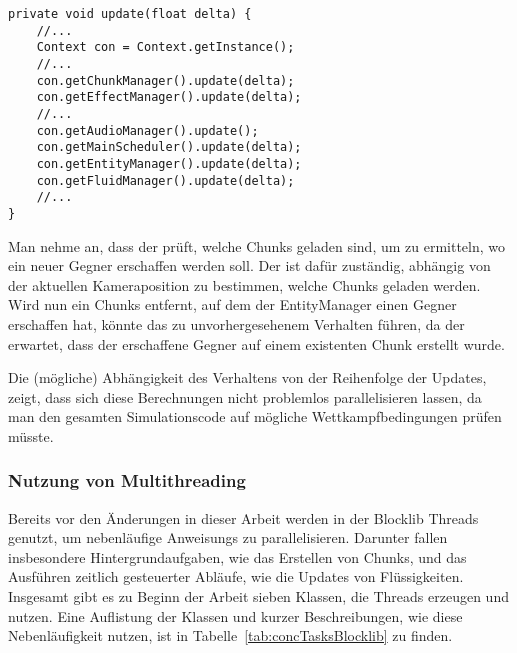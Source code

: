 \begin{lstlisting}[caption={Vereinfachte Update-Methode von \classGame{}.}, label={lst:gameUpdate},float={htbp}]
private void update(float delta) {
	//...
	Context con = Context.getInstance();
	//...
	con.getChunkManager().update(delta);
	con.getEffectManager().update(delta);
	//...
	con.getAudioManager().update();
	con.getMainScheduler().update(delta);
	con.getEntityManager().update(delta);
	con.getFluidManager().update(delta);
	//...
}
\end{lstlisting}

\begin{example}
Man nehme an, dass der \classEntityManager{} prüft, welche Chunks geladen sind, um zu ermitteln, wo ein neuer Gegner erschaffen werden soll. Der \classChunkManager{} ist dafür zuständig, abhängig von der aktuellen Kameraposition zu bestimmen, welche Chunks geladen werden. Wird nun ein Chunks entfernt, auf dem der EntityManager einen Gegner erschaffen hat, könnte das zu unvorhergesehenem Verhalten führen, da der \classEntityManager{} erwartet, dass der erschaffene Gegner auf einem existenten Chunk erstellt wurde.
\end{example}

Die (mögliche) Abhängigkeit des Verhaltens von der Reihenfolge der Updates, zeigt, dass sich diese Berechnungen nicht problemlos parallelisieren lassen, da man den gesamten Simulationscode auf mögliche Wettkampfbedingungen prüfen müsste.


\subsubsection{Nutzung von Multithreading}\label{sec:nutzungMultithreading}
Bereits vor den Änderungen in dieser Arbeit werden in der Blocklib Threads genutzt, um nebenläufige \glspl{Anweisung} zu parallelisieren. Darunter fallen insbesondere Hintergrundaufgaben, wie das Erstellen von Chunks, und das Ausführen zeitlich gesteuerter Abläufe, wie die Updates von Flüssigkeiten. Insgesamt gibt es zu Beginn der Arbeit sieben Klassen, die Threads erzeugen und nutzen. Eine Auflistung der Klassen und kurzer Beschreibungen, wie diese Nebenläufigkeit nutzen, ist in Tabelle~\ref{tab:concTasksBlocklib} zu finden.


